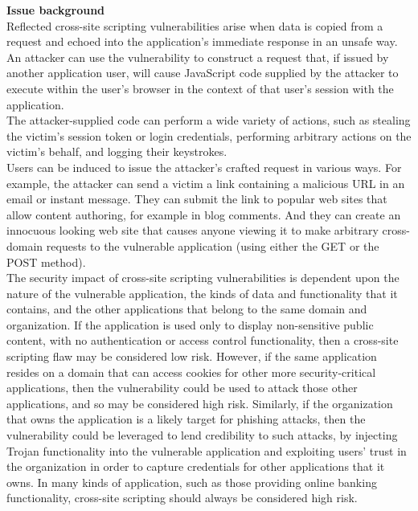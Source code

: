 \begin{itemize}
\textbf{Issue background} \\
Reflected cross-site scripting vulnerabilities arise when data is copied from a request and echoed into the application's immediate response in an unsafe way. An attacker can use the vulnerability to construct a request that, if issued by another application user, will cause JavaScript code supplied by the attacker to execute within the user's browser in the context of that user's session with the application. \\

The attacker-supplied code can perform a wide variety of actions, such as stealing the victim's session token or login credentials, performing arbitrary actions on the victim's behalf, and logging their keystrokes. \\

Users can be induced to issue the attacker's crafted request in various ways. For example, the attacker can send a victim a link containing a malicious URL in an email or instant message. They can submit the link to popular web sites that allow content authoring, for example in blog comments. And they can create an innocuous looking web site that causes anyone viewing it to make arbitrary cross-domain requests to the vulnerable application (using either the GET or the POST method). \\

The security impact of cross-site scripting vulnerabilities is dependent upon the nature of the vulnerable application, the kinds of data and functionality that it contains, and the other applications that belong to the same domain and organization. If the application is used only to display non-sensitive public content, with no authentication or access control functionality, then a cross-site scripting flaw may be considered low risk. However, if the same application resides on a domain that can access cookies for other more security-critical applications, then the vulnerability could be used to attack those other applications, and so may be considered high risk. Similarly, if the organization that owns the application is a likely target for phishing attacks, then the vulnerability could be leveraged to lend credibility to such attacks, by injecting Trojan functionality into the vulnerable application and exploiting users' trust in the organization in order to capture credentials for other applications that it owns. In many kinds of application, such as those providing online banking functionality, cross-site scripting should always be considered high risk. \\


\end{itemize}
